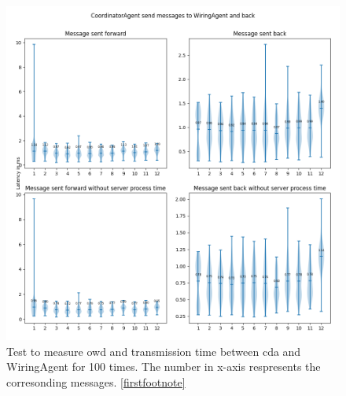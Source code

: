 \begin{figure}[p]
    \includegraphics[width=\textwidth]{figures/appendix/usecase/violin_CoordinatorAgent_to_WiringAgent.png}
    \centering
    \caption{Test to measure \gls{owd} and transmission time between \gls{cda} and 
    WiringAgent for 100 times. The number in x-axis respresents the 
    corresonding messages. \protect\ref{firstfootnote}}
    \label{fig: violin-CDA-WI}
\end{figure}



